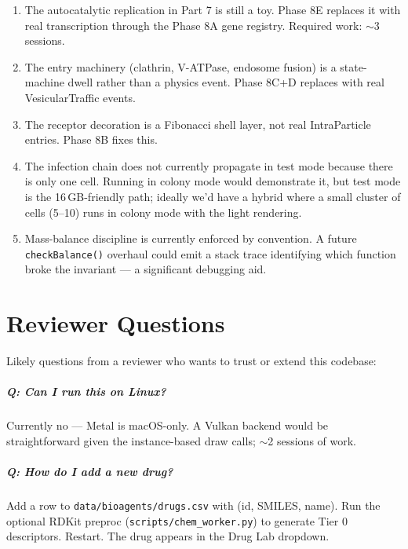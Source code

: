 \documentclass[11pt,letterpaper,twoside,openany]{book}
\newcommand{\code}[1]{\texttt{#1}}
\newcommand{\file}[1]{\texttt{\small#1}}
\begin{document}
\begin{enumerate}
  \item The autocatalytic replication in Part 7 is still a toy.
        Phase 8E replaces it with real transcription through the
        Phase 8A gene registry. Required work: $\sim$3 sessions.
  \item The entry machinery (clathrin, V-ATPase, endosome fusion)
        is a state-machine dwell rather than a physics event.
        Phase 8C+D replaces with real VesicularTraffic events.
  \item The receptor decoration is a Fibonacci shell layer, not
        real IntraParticle entries. Phase 8B fixes this.
  \item The infection chain does not currently propagate in test
        mode because there is only one cell. Running in colony
        mode would demonstrate it, but test mode is the
        16\,GB-friendly path; ideally we'd have a hybrid where a
        small cluster of cells (5--10) runs in colony mode with
        the light rendering.
  \item Mass-balance discipline is currently enforced by
        convention. A future \code{checkBalance()} overhaul could
        emit a stack trace identifying which function broke the
        invariant --- a significant debugging aid.
\end{enumerate}

\chapter{Reviewer Questions}
\label{ch:reviewer}

Likely questions from a reviewer who wants to trust or extend
this codebase:

\paragraph{Q: Can I run this on Linux?}

Currently no --- Metal is macOS-only. A Vulkan backend would be
straightforward given the instance-based draw calls; $\sim$2
sessions of work.

\paragraph{Q: How do I add a new drug?}

Add a row to \file{data/bioagents/drugs.csv} with (id, SMILES,
name). Run the optional RDKit preproc (\file{scripts/chem\_worker.py})
to generate Tier 0 descriptors. Restart. The drug appears in the
Drug Lab dropdown.
\end{document}
